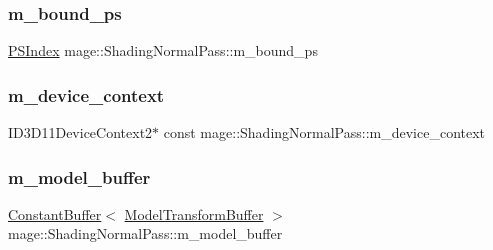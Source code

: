 \subsubsection{\texorpdfstring{m\+\_\+bound\+\_\+ps}{m\_bound\_ps}}
{\footnotesize\ttfamily \hyperlink{classmage_1_1_shading_normal_pass_a6d277753d26a7854c448b3e0d9275b19}{P\+S\+Index} mage\+::\+Shading\+Normal\+Pass\+::m\+\_\+bound\+\_\+ps\hspace{0.3cm}{\ttfamily [private]}}

\hypertarget{classmage_1_1_shading_normal_pass_aa4172e272ab2da77b91cd01db60a10e3}{}\label{classmage_1_1_shading_normal_pass_aa4172e272ab2da77b91cd01db60a10e3} 
\subsubsection{\texorpdfstring{m\+\_\+device\+\_\+context}{m\_device\_context}}
{\footnotesize\ttfamily I\+D3\+D11\+Device\+Context2$\ast$ const mage\+::\+Shading\+Normal\+Pass\+::m\+\_\+device\+\_\+context\hspace{0.3cm}{\ttfamily [private]}}

\hypertarget{classmage_1_1_shading_normal_pass_a7068a84cf75fae7156c4cd6e39f0700f}{}\label{classmage_1_1_shading_normal_pass_a7068a84cf75fae7156c4cd6e39f0700f} 
\subsubsection{\texorpdfstring{m\+\_\+model\+\_\+buffer}{m\_model\_buffer}}
{\footnotesize\ttfamily \hyperlink{structmage_1_1_constant_buffer}{Constant\+Buffer}$<$ \hyperlink{structmage_1_1_model_transform_buffer}{Model\+Transform\+Buffer} $>$ mage\+::\+Shading\+Normal\+Pass\+::m\+\_\+model\+\_\+buffer\hspace{0.3cm}{\ttfamily [private]}}

\hypertarget{classmage_1_1_shading_normal_pass_a224c8553f634749a231eff291c79edeb}{}\label{classmage_1_1_shading_normal_pass_a224c8553f634749a231eff291c79edeb} 
